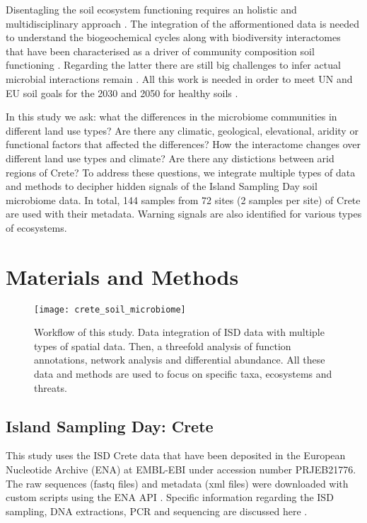 \documentclass[unnumsec,webpdf,contemporary,large]{oup-authoring-template}%
\theoremstyle{thmstyleone}%
\theoremstyle{thmstyletwo}%
\theoremstyle{thmstylethree}%
\begin{document}
Disentagling the soil ecosystem functioning requires an holistic and 
multidisciplinary approach \cite{vogel2022}. The integration of the afformentioned
data is needed to understand the biogeochemical cycles along with biodiversity interactomes 
that have been characterised as a driver of community composition soil
functioning \cite{GUSEVA2022108604}.
Regarding the latter there are still big challenges to infer actual microbial
interactions remain \cite{Faust2021}. All this work is needed in order to meet
UN and EU soil goals for the 2030 and 2050 for healthy soils \cite{LAL2021e00398}.

In this study we ask: what the differences in the microbiome communities in different land use types?
Are there any climatic, geological, elevational, aridity or functional factors that affected the differences?
How the interactome changes over different land use types and climate?
Are there any distictions between arid regions of Crete?
To address these questions, we integrate multiple types of data and methods to decipher hidden 
signals of the Island Sampling Day soil microbiome data. In total, 144 samples from
72 sites (2 samples per site) of Crete are used with their metadata.
Warning signals are also identified for various types of ecosystems.


\section{Materials and Methods}\label{methods}

\begin{figure}[t] 
    \centering\texttt{[image: crete\_soil\_microbiome]}
    \caption{Workflow of this study. Data integration of ISD data with multiple types of spatial data. Then, a threefold analysis of function annotations, network analysis and differential abundance. All these data and methods are used to focus on specific taxa, ecosystems and threats.}
    \label{fig:workflow}
\end{figure}

\subsection{Island Sampling Day: Crete}\label{isd_data}

This study uses the ISD Crete data that have been deposited
in the European Nucleotide Archive (ENA) at EMBL-EBI under accession number PRJEB21776.
The raw sequences (fastq files) and metadata (xml files) were downloaded with custom scripts using the ENA API \cite{Yuan2023}.
Specific information regarding the ISD sampling, DNA extractions, PCR and sequencing
are discussed here \cite{holm2024}.
\end{document}
